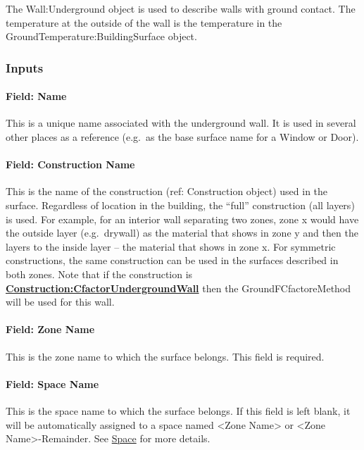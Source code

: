 The Wall:Underground object is used to describe walls with ground contact. The temperature at the outside of the wall is the temperature in the GroundTemperature:BuildingSurface object.

\subsubsection{Inputs}\label{inputs-6-029}

\paragraph{Field: Name}\label{field-name-2-039}

This is a unique name associated with the underground wall. It is used in several other places as a reference (e.g.~as the base surface name for a Window or Door).

\paragraph{Field: Construction Name}\label{field-construction-name-2-001}

This is the name of the construction (ref: Construction object) used in the surface. Regardless of location in the building, the ``full'' construction (all layers) is used. For example, for an interior wall separating two zones, zone x would have the outside layer (e.g.~drywall) as the material that shows in zone y and then the layers to the inside layer -- the material that shows in zone x. For symmetric constructions, the same construction can be used in the surfaces described in both zones. Note that if the construction is \textbf{\hyperref[constructioncfactorundergroundwall]{Construction:CfactorUndergroundWall}} then the GroundFCfactoreMethod will be used for this wall.

\paragraph{Field: Zone Name}\label{field-zone-name-2-007}

This is the zone name to which the surface belongs. This field is required.

\paragraph{Field: Space Name}\label{field-space-name-2-007}

This is the space name to which the surface belongs. If this field is left blank, it will be automatically assigned to a space named <Zone Name> or <Zone Name>-Remainder. See \hyperref[space]{Space} for more details.

